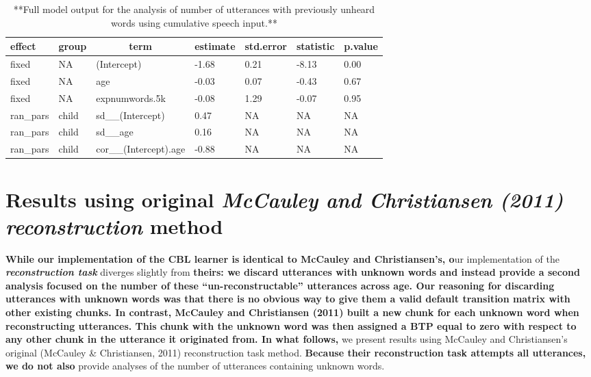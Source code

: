 \documentclass[man,mask,floatsintext]{apa6}
\begin{document}
\begin{table}[tbp]
\begin{center}
\begin{threeparttable}
\caption{\label{tab:tab-unseen_words-cumu-MAIN}**Full model output for the analysis of number of utterances with previously unheard words using cumulative speech input.**}
\begin{tabular}{lllllll}
\toprule
effect & \multicolumn{1}{c}{group} & \multicolumn{1}{c}{term} & \multicolumn{1}{c}{estimate} & \multicolumn{1}{c}{std.error} & \multicolumn{1}{c}{statistic} & \multicolumn{1}{c}{p.value}\\
\midrule
fixed & NA & (Intercept) & -1.68 & 0.21 & -8.13 & 0.00\\
fixed & NA & age & -0.03 & 0.07 & -0.43 & 0.67\\
fixed & NA & expnumwords.5k & -0.08 & 1.29 & -0.07 & 0.95\\
ran\_pars & child & sd\_\_(Intercept) & 0.47 & NA & NA & NA\\
ran\_pars & child & sd\_\_age & 0.16 & NA & NA & NA\\
ran\_pars & child & cor\_\_(Intercept).age & -0.88 & NA & NA & NA\\
\bottomrule
\end{tabular}
\end{threeparttable}
\end{center}
\end{table}

\pagebreak

\section{\texorpdfstring{Results using original \emph{McCauley and
Christiansen (2011) reconstruction}
method}{Results using original McCauley and Christiansen (2011) reconstruction method}}\label{results-using-original-mccauley-and-christiansen-2011-reconstruction-method}

\textbf{While our implementation of the CBL learner is identical to
McCauley and Christiansen's, o}ur implementation of the
\textbf{\emph{reconstruction task}} diverges slightly from
\textbf{theirs: we discard utterances with unknown words and instead
provide a second analysis focused on the number of these
\enquote{un-reconstructable} utterances across age. Our reasoning for
discarding utterances with unknown words was that there is no obvious
way to give them a valid default transition matrix with other existing
chunks. In contrast, McCauley and Christiansen (2011) built a new chunk
for each unknown word when reconstructing utterances. This chunk with
the unknown word was then assigned a BTP equal to zero with respect to
any other chunk in the utterance it originated from. In what follows,}
we present results using McCauley and Christiansen's original (McCauley
\& Christiansen, 2011) reconstruction task method. \textbf{Because their
reconstruction task attempts all utterances, we do not also} provide
analyses of the number of utterances containing unknown words.
\end{document}
